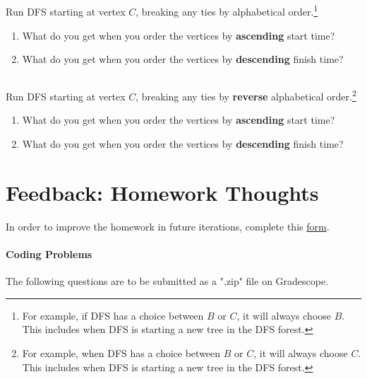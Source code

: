 \documentclass [12pt]{article}
\begin{document}
\subsection {} 

Run DFS starting at vertex $C$, breaking any ties by alphabetical order.\footnote {For example, if DFS has a choice between $B$ or $C$, it will always choose $B$. This includes when DFS is starting a new tree in the DFS forest.}

\begin{enumerate}[label=(\alph *)]
    \item What do you get when you order the vertices by \textbf {ascending} start time?
    \item What do you get when you order the vertices by \textbf {descending} finish time?
\end{enumerate} 

\subsection {}

Run DFS starting at vertex $C$, breaking any ties by \textbf {reverse} alphabetical order.\footnote {For example, when DFS has a choice between $B$ or $C$, it will always choose $C$. This includes when DFS is starting a new tree in the DFS forest.}

\begin{enumerate}[label=(\alph *)]
    \item What do you get when you order the vertices by \textbf {ascending} start time?
    \item What do you get when you order the vertices by \textbf {descending} finish time?
\end{enumerate} 



\pagebreak
\section{Feedback: Homework Thoughts }

In order to improve the homework in future iterations, complete this \href{https://forms.gle/LwMVLqf3FFuhJxVv7}{form}.




\begin{Instruction}

\paragraph{Coding Problems} The following questions are to be submitted as a ".zip" file on Gradescope. 

\end{Instruction}
\end{document}
